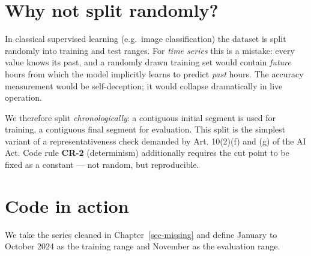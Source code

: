\documentclass[
  english,
  letterpaper,
]{scrbook}
\begin{document}
\section{Why not split randomly?}\label{why-not-split-randomly}

In classical supervised learning (e.g.~image classification) the dataset
is split randomly into training and test ranges. For \emph{time series}
this is a mistake: every value knows its past, and a randomly drawn
training set would contain \emph{future} hours from which the model
implicitly learns to predict \emph{past} hours. The accuracy measurement
would be self-deception; it would collapse dramatically in live
operation.

We therefore split \emph{chronologically}: a contiguous initial segment
is used for training, a contiguous final segment for evaluation. This
split is the simplest variant of a representativeness check demanded by
Art. 10(2)(f) and (g) of the AI Act. Code rule \textbf{CR-2}
(determinism) additionally requires the cut point to be fixed as a
constant --- not random, but reproducible.

\section{Code in action}\label{code-in-action-2}

We take the series cleaned in Chapter~\ref{sec-missing} and define
January to October 2024 as the training range and November as the
evaluation range.
\end{document}
